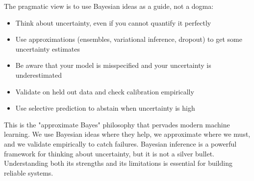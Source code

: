 The pragmatic view is to use Bayesian ideas as a guide, not a dogma:

\begin{itemize}
\item Think about uncertainty, even if you cannot quantify it perfectly
\item Use approximations (ensembles, variational inference, dropout) to get some uncertainty estimates
\item Be aware that your model is misspecified and your uncertainty is underestimated
\item Validate on held out data and check calibration empirically
\item Use selective prediction to abstain when uncertainty is high
\end{itemize}

This is the "approximate Bayes" philosophy that pervades modern machine learning. We use Bayesian ideas where they help, we approximate where we must, and we validate empirically to catch failures. Bayesian inference is a powerful framework for thinking about uncertainty, but it is not a silver bullet. Understanding both its strengths and its limitations is essential for building reliable systems.

\vspace{2em}


